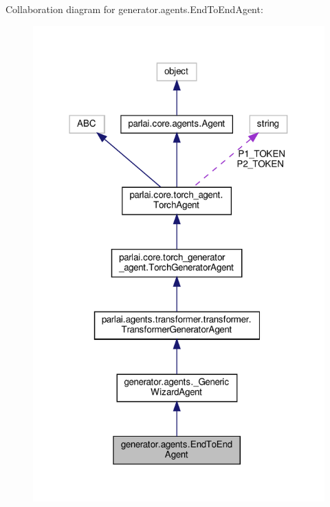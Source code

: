 Collaboration diagram for generator.\+agents.\+End\+To\+End\+Agent\+:
\nopagebreak
\begin{figure}[H]
\begin{center}
\leavevmode
\includegraphics[width=318pt]{classgenerator_1_1agents_1_1EndToEndAgent__coll__graph}
\end{center}
\end{figure}
